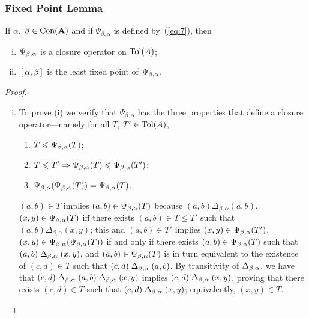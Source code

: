 \subsubsection{Fixed Point Lemma}
\begin{lemma}
  \label{lem:fixed-point-comm}
  If $\alpha$, $\beta\in \operatorname{Con}(\mathbf{A})$ and 
  if $\Psi_{\beta, \alpha}$ is defined by~(\ref{eq:7}), then 
  \begin{enumerate}[(i)]
  \item  $\Psi_{\beta, \alpha}$ is a closure operator on $\operatorname{Tol}(A)$;
  \item  $[\alpha, \beta]$ is the least fixed point of $\Psi_{\beta, \alpha}$.
  \end{enumerate}
\end{lemma}
\begin{proof}\
  \begin{enumerate}[(i)]
  \item 
    To prove (i) we verify that
    $\Psi_{\beta, \alpha}$ has the three properties that define a closure
    operator---namely for all $T$, $T' \in \operatorname{Tol}(A)$,
  \begin{enumerate}[(c.1)]
  \item \label{item:c1} $T  \leqslant \Psi_{\beta, \alpha}(T )$;     
  \item \label{item:c2} $T  \leqslant T'  \Rightarrow \Psi_{\beta, \alpha}(T) \leqslant \Psi_{\beta, \alpha}(T')$;    
  \item \label{item:c3} $\Psi_{\beta, \alpha}(\Psi_{\beta, \alpha}(T))  = \Psi_{\beta, \alpha}(T)$. 
  \end{enumerate}

  \smallskip

   $(a,b) \in T $
  implies $(a,b) \in \Psi_{\beta, \alpha}(T )$ because $(a,b)\mathrel{\Delta_{\beta, \alpha}} (a,b)$.\\[4pt]
   $(x,y) \in \Psi_{\beta, \alpha}(T )$ iff there exists
  $(a,b) \in T  \leq T'$ such that
  $(a,b) \mathrel{\Delta_{\beta, \alpha}} (x,y)$; this and $(a,b) \in T'$ implies
  $(x,y) \in \Psi_{\beta, \alpha}(T')$.\\[4pt]
   $(x,y) \in \Psi_{\beta, \alpha}(\Psi_{\beta, \alpha}(T))$ if and only if
  there exists $(a,b) \in \Psi_{\beta, \alpha}(T)$ such that
  $(a,b) \mathrel{\Delta_{\beta, \alpha}} (x,y)$, and $(a,b) \in \Psi_{\beta, \alpha}(T)$ is in turn equivalent to 
  the existence of $(c,d) \in T $ such that
  $(c,d) \mathrel{\Delta_{\beta, \alpha}} (a,b)$. By transitivity of $\Delta_{\beta, \alpha}$, we have that
  $(c,d) \mathrel{\Delta_{\beta, \alpha}} (a,b) \mathrel{\Delta_{\beta, \alpha}} (x,y)$ implies
  $(c,d) \mathrel{\Delta_{\beta, \alpha}} (x,y)$, proving that there exists $(c,d) \in T $ such that
  $(c,d) \mathrel{\Delta_{\beta, \alpha}} (x,y)$; equivalently, $(x,y) \in T $.


\end{enumerate}
\end{proof}
